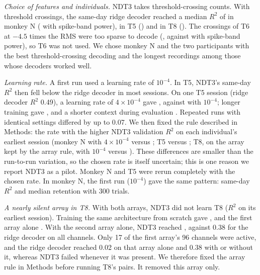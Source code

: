 \documentclass[pdflatex,sn-nature]{sn-jnl}
\begin{document}
\textit{Choice of features and individuals.} NDT3 takes threshold-crossing counts. With threshold crossings, the same-day
ridge decoder reached a median $R^2$ of  in monkey N ( with spike-band power),
 in T5 () and  in T8 (). The crossings of T6 at
$-4.5$ times the RMS were too sparse to decode (, against  with spike-band power), so
T6 was not used. We chose monkey N and the two participants with the best threshold-crossing decoding and the longest
recordings among those whose decoders worked well.

\textit{Learning rate.} A first run used a learning rate of $10^{-4}$. In T5, NDT3's same-day $R^2$ then fell below the
ridge decoder in most sessions. On one T5 session (ridge decoder $R^2$ 0.49), a learning rate of $4 \times 10^{-4}$ gave
, against  with $10^{-4}$; longer training gave , and a shorter context
during evaluation . Repeated runs with identical settings differed by up to 0.07. We then fixed the rule
described in Methods: the rate with the higher NDT3 validation $R^2$ on each individual's earliest session (monkey N
 with $4 \times 10^{-4}$ versus ; T5  versus
; T8, on the array kept by the array rule,  with $10^{-4}$ versus
). These differences are smaller than the run-to-run variation, so the chosen rate is itself
uncertain; this is one reason we report NDT3 as a pilot. Monkey N and T5 were rerun completely with the chosen rate. In monkey N, the first run
($10^{-4}$) gave the same pattern: same-day $R^2$  and median retention  with
300 trials.

\textit{A nearly silent array in T8.} With both arrays, NDT3 did not learn T8 ($R^2$  on its earliest
session). Training the same architecture from scratch gave , and the first array alone
. With the second array alone, NDT3 reached , against 0.38 for the ridge decoder on all
channels. Only 17 of the first array's 96 channels were active, and the ridge decoder reached 0.02 on that array alone
and 0.38 with or without it, whereas NDT3 failed whenever it was present. We therefore fixed the array rule
in Methods before running T8's pairs. It removed this array only.
\end{document}
